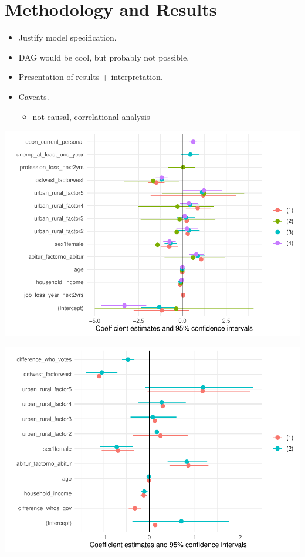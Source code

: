 \documentclass[
]{article}
\providecommand{\tightlist}{%
  \setlength{\itemsep}{0pt}\setlength{\parskip}{0pt}}
\begin{document}
\hypertarget{methodology-and-results}{%
\section{Methodology and Results}\label{methodology-and-results}}

\begin{itemize}
\item
  Justify model specification.
\item
  DAG would be cool, but probably not possible.
\item
  Presentation of results + interpretation.
\item
  Caveats.

  \begin{itemize}
  \tightlist
  \item
    not causal, correlational analysis
  \end{itemize}
\end{itemize}

\includegraphics{AVCD_Draft_Assignment_Pruned_files/figure-latex/simple-models-insecurity-1.pdf}

\includegraphics{AVCD_Draft_Assignment_Pruned_files/figure-latex/simple-models-lack-rep-1.pdf}
\end{document}

